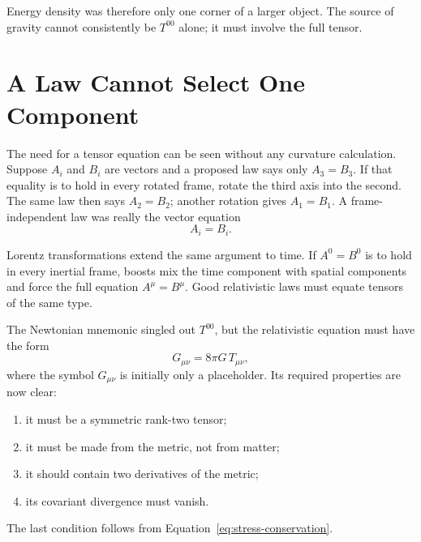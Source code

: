 \begin{classroomqa}
\end{classroomqa}

Energy density was therefore only one corner of a larger object. The source
of gravity cannot consistently be \(T^{00}\) alone; it must involve the full
tensor.

\section{A Law Cannot Select One Component}

The need for a tensor equation can be seen without any curvature calculation.
Suppose \(A_i\) and \(B_i\) are vectors and a proposed law says only
\(A_3=B_3\). If that equality is to hold in every rotated frame, rotate the
third axis into the second. The same law then says \(A_2=B_2\); another
rotation gives \(A_1=B_1\). A frame-independent law was really the vector
equation
\begin{equation}
 A_i=B_i.
\end{equation}

Lorentz transformations extend the same argument to time. If \(A^0=B^0\) is
to hold in every inertial frame, boosts mix the time component with spatial
components and force the full equation \(A^\mu=B^\mu\). Good relativistic
laws must equate tensors of the same type.

The Newtonian mnemonic singled out \(T^{00}\), but the relativistic equation
must have the form
\begin{equation}
 G_{\mu\nu}=8\pi G\,T_{\mu\nu},
 \label{eq:field-schematic}
\end{equation}
where the symbol \(G_{\mu\nu}\) is initially only a placeholder. Its required
properties are now clear:
\begin{enumerate}
 \item it must be a symmetric rank-two tensor;
 \item it must be made from the metric, not from matter;
 \item it should contain two derivatives of the metric;
 \item its covariant divergence must vanish.
\end{enumerate}
The last condition follows from Equation~\eqref{eq:stress-conservation}.

